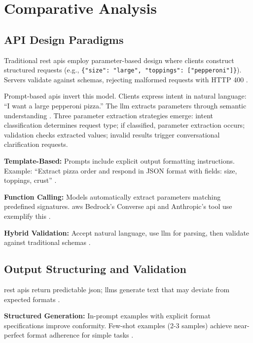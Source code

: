 \section{Comparative Analysis}

\subsection{API Design Paradigms}

Traditional \gls{rest} \gls{api}s employ parameter-based design where clients construct structured requests (e.g., \texttt{\{"size": "large", "toppings": ["pepperoni"]\}}). Servers validate against schemas, rejecting malformed requests with HTTP 400 \cite{richardson_restful_2007}.

Prompt-based \gls{api}s invert this model. Clients express intent in natural language: ``I want a large pepperoni pizza.'' The \gls{llm} extracts parameters through semantic understanding \cite{brown_language_2020}. Three parameter extraction strategies emerge: intent classification determines request type; if classified, parameter extraction occurs; validation checks extracted values; invalid results trigger conversational clarification requests.

\textbf{Template-Based:} Prompts include explicit output formatting instructions. Example: ``Extract pizza order and respond in JSON format with fields: size, toppings, crust'' \cite{sahoo_systematic_2025}.

\textbf{Function Calling:} Models automatically extract parameters matching predefined signatures. \gls{aws} Bedrock's Converse \gls{api} and Anthropic's tool use exemplify this \cite{aws_bedrock_2025, schluntz_building_2024}.

\textbf{Hybrid Validation:} Accept natural language, use \gls{llm} for parsing, then validate against traditional schemas \cite{lercher_managing_2024}.

\subsection{Output Structuring and Validation}

\gls{rest} \gls{api}s return predictable \gls{json}; \gls{llm}s generate text that may deviate from expected formats \cite{martinlopez_online_2022}.

\textbf{Structured Generation:} In-prompt examples with explicit format specifications improve conformity. Few-shot examples (2-3 samples) achieve near-perfect format adherence for simple tasks \cite{sahoo_systematic_2025, chen_prompt_2025}.

